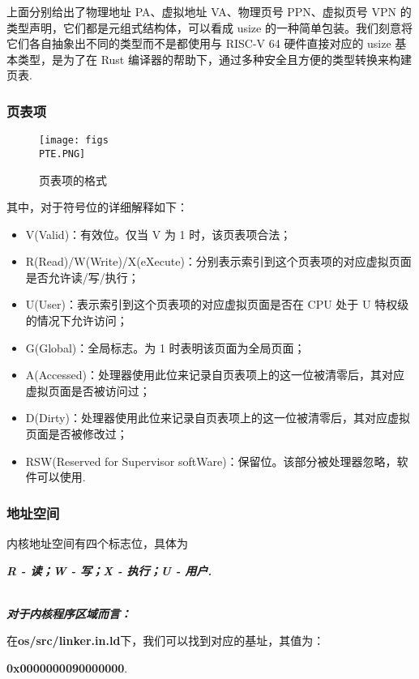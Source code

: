 \documentclass{article}
\begin{document}
上面分别给出了物理地址 PA、虚拟地址 VA、物理页号 PPN、虚拟页号 VPN 的类型声明，它们都是元组式结构体，可以看成 usize 的一种简单包装。我们刻意将它们各自抽象出不同的类型而不是都使用与 RISC-V 64 硬件直接对应的 usize 基本类型，是为了在 Rust 编译器的帮助下，通过多种安全且方便的类型转换来构建页表.

\subsubsection{页表项}

\begin{figure}[h]
    \centering
    \texttt{[image: figs\\PTE.PNG]}
    \caption{页表项的格式}
    \label{P}
\end{figure}

其中，对于符号位的详细解释如下：

\begin{itemize}
    \item V(Valid)：有效位。仅当 V 为 1 时，该页表项合法；
    \item R(Read)/W(Write)/X(eXecute)：分别表示索引到这个页表项的对应虚拟页面是否允许读/写/执行；
    \item U(User)：表示索引到这个页表项的对应虚拟页面是否在 CPU 处于 U 特权级的情况下允许访问；
    \item G(Global)：全局标志。为 1 时表明该页面为全局页面；
    \item A(Accessed)：处理器使用此位来记录自页表项上的这一位被清零后，其对应虚拟页面是否被访问过；
    \item D(Dirty)：处理器使用此位来记录自页表项上的这一位被清零后，其对应虚拟页面是否被修改过；
    \item RSW(Reserved for Supervisor softWare)：保留位。该部分被处理器忽略，软件可以使用.
\end{itemize}

\subsubsection{地址空间}
内核地址空间有四个标志位，具体为
\begin{center}
\textbf{\textit{R - 读；W - 写；X - 执行；U - 用户.}}
\end{center}
\\
\textbf{\textit{对于内核程序区域而言：}}

在\textbf{os/src/linker.in.ld}下，我们可以找到对应的基址，其值为：
\begin{center}
    \textbf{0x0000000090000000}.
\end{center}
\end{document}
